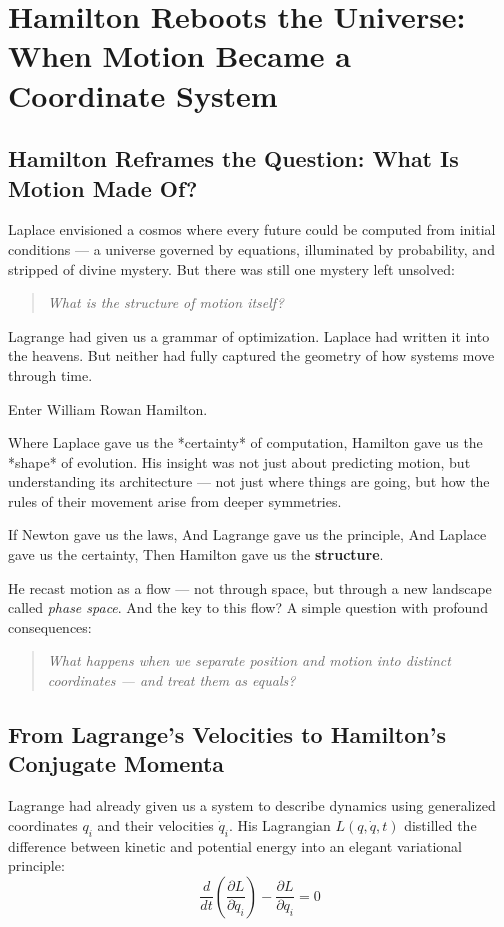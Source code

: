 \section{Hamilton Reboots the Universe: When Motion Became a Coordinate System}

\subsection{Hamilton Reframes the Question: What Is Motion Made Of?}

Laplace envisioned a cosmos where every future could be computed from initial conditions — a universe governed by equations, illuminated by probability, and stripped of divine mystery.  
But there was still one mystery left unsolved:

\begin{quote}
\textit{What is the structure of motion itself?}
\end{quote}

Lagrange had given us a grammar of optimization. Laplace had written it into the heavens. But neither had fully captured the geometry of how systems move through time.

Enter William Rowan Hamilton.

Where Laplace gave us the *certainty* of computation, Hamilton gave us the *shape* of evolution. His insight was not just about predicting motion, but understanding its architecture — not just where things are going, but how the rules of their movement arise from deeper symmetries.

If Newton gave us the laws,  
And Lagrange gave us the principle,  
And Laplace gave us the certainty,  
Then Hamilton gave us the \textbf{structure}.

He recast motion as a flow — not through space, but through a new landscape called \textit{phase space}. And the key to this flow? A simple question with profound consequences:

\begin{quote}
\textit{What happens when we separate position and motion into distinct coordinates — and treat them as equals?}
\end{quote}

\subsection{From Lagrange’s Velocities to Hamilton’s Conjugate Momenta}

Lagrange had already given us a system to describe dynamics using generalized coordinates \( q_i \) and their velocities \( \dot{q}_i \). His Lagrangian \( L(q, \dot{q}, t) \) distilled the difference between kinetic and potential energy into an elegant variational principle:
\[
\frac{d}{dt} \left( \frac{\partial L}{\partial \dot{q}_i} \right) - \frac{\partial L}{\partial q_i} = 0
\]

